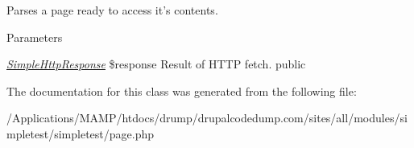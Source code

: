 \label{class_simple_page_a0cb05e800a743639a3dcfe6bb7d0f67a}
Parses a page ready to access it's contents. 
\begin{DoxyParams}{Parameters}
\item[{\em \hyperlink{class_simple_http_response}{SimpleHttpResponse}}]\$response Result of HTTP fetch.  public \end{DoxyParams}


The documentation for this class was generated from the following file:\begin{DoxyCompactItemize}
\item 
/Applications/MAMP/htdocs/drump/drupalcodedump.com/sites/all/modules/simpletest/simpletest/page.php\end{DoxyCompactItemize}

